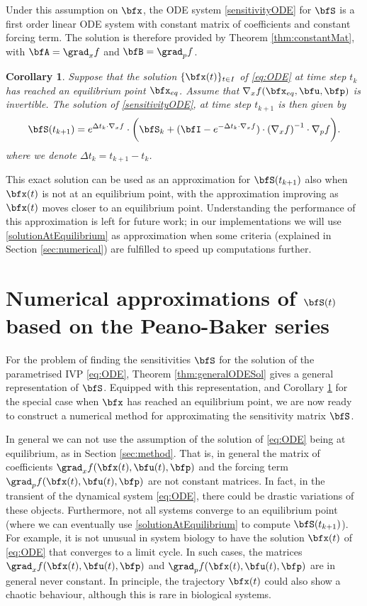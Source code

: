 \documentclass[DIV=12]{scrartcl} %
\newtheorem{corollary}{Corollary}
\theoremstyle{definition}
\begin{document}
Under this assumption on $\bfx$, the ODE system \eqref{sensitivityODE} for $\bfS$ is a first order linear ODE system with constant matrix of coefficients and constant forcing term. The solution is therefore provided by Theorem \ref{thm:constantMat}, with $\bfA = \grad _x f$ and $\bfB = \grad _p f$.
\begin{corollary}
\label{cor:Sequi}
Suppose that the solution $\{ \bfx (t) \} _{t \in I}$ of \eqref{eq:ODE} at time step $t_k$ has reached an equilibrium point $\bfx _{eq}$. Assume that $\nabla_xf(\bfx_{eq},\bfu,\bfp)$ is invertible. The solution of \eqref{sensitivityODE}, at time step $t_{k+1}$ is then given by
\begin{equation}
    \label{solutionAtEquilibrium}
    \bfS(t_{k+1})=e^{\Delta t _k \cdot \nabla_xf}\cdot \biggl(\bfS_k+(\bfI-e^{-\Delta t _k\cdot \nabla_xf})\cdot\left(\nabla_xf\right)^{-1}\cdot\nabla_pf\biggr).
\end{equation}
where we denote $\Delta t _k = t_{k+1} - t_k$.
\end{corollary}
This exact solution can be used as an approximation for $\bfS(t_{k+1})$ also when $\bfx (t)$ is not at an equilibrium point, with the approximation improving as $\bfx (t)$ moves closer to an equilibrium point. Understanding the performance of this approximation is left for future work; in our implementations we will use \eqref{solutionAtEquilibrium} as approximation when some criteria (explained in Section \ref{sec:numerical}) are fulfilled  to speed up computations further.

\section{Numerical approximations of $\bfS(t)$ based on the Peano-Baker series}
\label{sec:genSolution}
For the problem of finding the sensitivities $\bfS$ for the solution of the parametrised IVP \eqref{eq:ODE}, Theorem \ref{thm:generalODESol} gives a general representation of $\bfS$.  
Equipped with this representation, and Corollary \ref{cor:Sequi} for the special case when $\bfx$ has reached an equilibrium point, we are now ready to construct a numerical method for approximating the sensitivity matrix $\bfS$. 
 
In general we can not use the assumption of the solution of \eqref{eq:ODE} being at equilibrium, as in Section \ref{sec:method}. That is, in general the matrix of coefficients $\grad _x f (\bfx(t), \bfu(t) , \bfp)$ and the forcing term $\grad _p f (\bfx(t), \bfu(t) , \bfp)$ are not constant matrices. In fact, in the transient of the dynamical system \eqref{eq:ODE}, there could be drastic variations of these objects. Furthermore, not all systems converge to an equilibrium point (where we can eventually use \eqref{solutionAtEquilibrium} to compute $\bfS(t_{k+1})$). For example, it is not unusual in system biology to have the solution $\bfx(t)$ of \eqref{eq:ODE} that converges to a limit cycle. In such cases, the matrices $\grad _x f (\bfx(t), \bfu(t) , \bfp)$ and $\grad _p f (\bfx(t), \bfu(t) , \bfp)$ are in general never constant. In principle, the trajectory $\bfx(t)$ could also show a chaotic behaviour, although this is rare in biological systems. 
\end{document}

